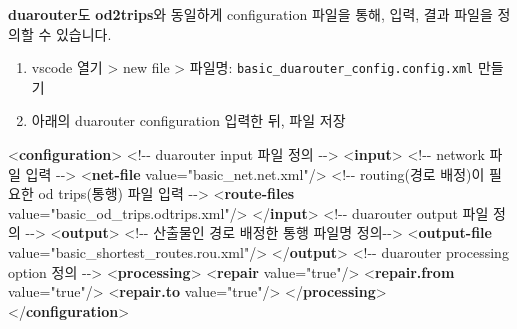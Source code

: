 \documentclass[
  letterpaper,
  DIV=11,
  numbers=noendperiod]{scrreprt}
\newenvironment{Shaded}{\begin{snugshade}}{\end{snugshade}}
\newcommand{\CommentTok}[1]{\textcolor[rgb]{0.37,0.37,0.37}{#1}}
\newcommand{\KeywordTok}[1]{\textcolor[rgb]{0.00,0.23,0.31}{\textbf{#1}}}
\newcommand{\NormalTok}[1]{\textcolor[rgb]{0.00,0.23,0.31}{#1}}
\newcommand{\OtherTok}[1]{\textcolor[rgb]{0.00,0.23,0.31}{#1}}
\newcommand{\StringTok}[1]{\textcolor[rgb]{0.13,0.47,0.30}{#1}}
\begin{document}
\textbf{duarouter}도 \textbf{od2trips}와 동일하게 configuration 파일을
통해, 입력, 결과 파일을 정의할 수 있습니다.

\begin{enumerate}
\def\labelenumi{\arabic{enumi}.}
\item
  vscode 열기 \textgreater{} new file \textgreater{} 파일명:
  \texttt{basic\_duarouter\_config.config.xml} 만들기
\item
  아래의 duarouter configuration 입력한 뒤, 파일 저장
\end{enumerate}

\begin{Shaded}
\begin{Highlighting}[]
\NormalTok{\textless{}}\KeywordTok{configuration}\NormalTok{\textgreater{}}
\CommentTok{\textless{}!{-}{-} duarouter input 파일 정의 {-}{-}\textgreater{}}
\NormalTok{    \textless{}}\KeywordTok{input}\NormalTok{\textgreater{}}
        \CommentTok{\textless{}!{-}{-} network 파일 입력 {-}{-}\textgreater{}}
\NormalTok{        \textless{}}\KeywordTok{net{-}file} \OtherTok{value=}\StringTok{"basic\_net.net.xml"}\NormalTok{/\textgreater{}}
        \CommentTok{\textless{}!{-}{-} routing(경로 배정)이 필요한 od trips(통행) 파일 입력 {-}{-}\textgreater{}}
\NormalTok{        \textless{}}\KeywordTok{route{-}files} \OtherTok{value=}\StringTok{"basic\_od\_trips.odtrips.xml"}\NormalTok{/\textgreater{}}
\NormalTok{    \textless{}/}\KeywordTok{input}\NormalTok{\textgreater{}}
\CommentTok{\textless{}!{-}{-} duarouter output 파일 정의 {-}{-}\textgreater{}}
\NormalTok{    \textless{}}\KeywordTok{output}\NormalTok{\textgreater{}}
        \CommentTok{\textless{}!{-}{-} 산출물인 경로 배정한 통행 파일명 정의{-}{-}\textgreater{}}
\NormalTok{        \textless{}}\KeywordTok{output{-}file} \OtherTok{value=}\StringTok{"basic\_shortest\_routes.rou.xml"}\NormalTok{/\textgreater{}}
\NormalTok{    \textless{}/}\KeywordTok{output}\NormalTok{\textgreater{}}
\CommentTok{\textless{}!{-}{-} duarouter processing option 정의 {-}{-}\textgreater{}}
\NormalTok{    \textless{}}\KeywordTok{processing}\NormalTok{\textgreater{}}
\NormalTok{        \textless{}}\KeywordTok{repair} \OtherTok{value=}\StringTok{"true"}\NormalTok{/\textgreater{}}
\NormalTok{        \textless{}}\KeywordTok{repair.from} \OtherTok{value=}\StringTok{"true"}\NormalTok{/\textgreater{}}
\NormalTok{        \textless{}}\KeywordTok{repair.to} \OtherTok{value=}\StringTok{"true"}\NormalTok{/\textgreater{}}
\NormalTok{    \textless{}/}\KeywordTok{processing}\NormalTok{\textgreater{}}
\NormalTok{\textless{}/}\KeywordTok{configuration}\NormalTok{\textgreater{}}
\end{Highlighting}
\end{Shaded}
\end{document}
